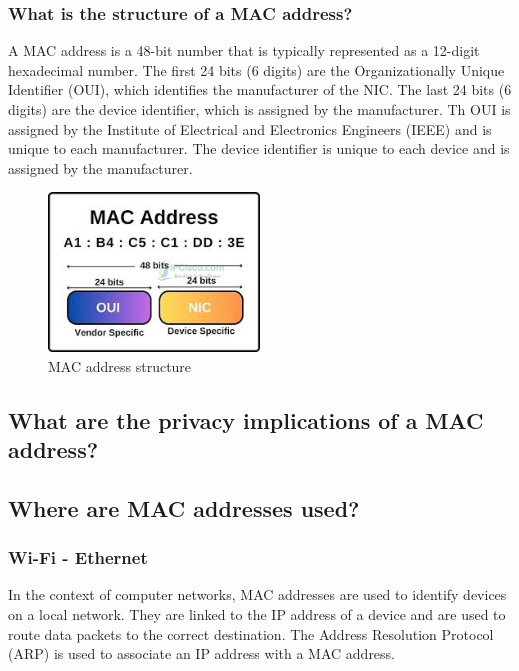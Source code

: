 \documentclass{article}
\begin{document}
    \subsubsection{\label{sec:Structure}What is the structure of a MAC address?}
    A MAC address is a 48-bit number that is typically represented as a 12-digit hexadecimal number.
    The first 24 bits (6 digits) are the Organizationally Unique Identifier (OUI), 
    which identifies the manufacturer of the NIC.
    The last 24 bits (6 digits) are the device identifier, which is assigned by the manufacturer.
    Th OUI is assigned by the Institute of Electrical and Electronics Engineers (IEEE)
    and is unique to each manufacturer.
    The device identifier is unique to each device and is assigned by the manufacturer.
  \begin{figure}[H]
      \centering
      \includegraphics[width=0.5\textwidth]{pictures/mac.jpeg}
      \caption{MAC address structure \cite{MAC}}
      \label{fig:MAC}
  \end{figure}

  \subsection{\label{sec:Privacy}What are the privacy implications of a MAC address?}
  \subsection{\label{sec:Where}Where are MAC addresses used?}
    \subsubsection{\label{subsec:Wi-Fi}Wi-Fi - Ethernet}
  In the context of computer networks, MAC addresses are used to identify devices on a local network.
  They are linked to the IP address of a device and are used to route data packets to the correct destination.
  The Address Resolution Protocol (ARP) is used to associate an IP address with a MAC address.
\end{document}
